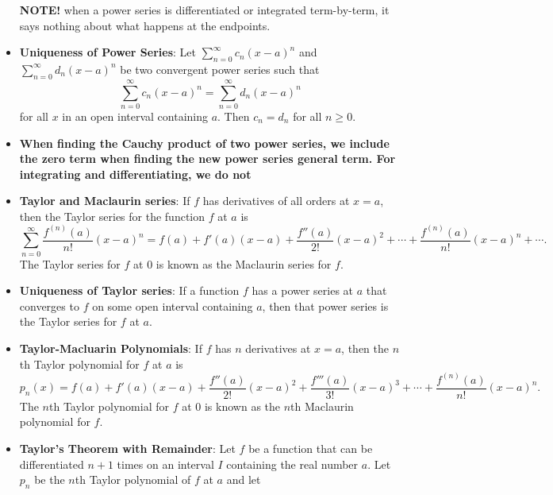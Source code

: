 \documentclass{report}
\begin{document}
\begin{itemize}
                \textbf{NOTE!} when a power series is differentiated or integrated term-by-term, it says nothing about what happens at the endpoints.
            \item \textbf{Uniqueness of Power Series}:
                Let $\sum_{n=0}^{\infty} c_n (x - a)^n$ and $\sum_{n=0}^{\infty} d_n (x - a)^n$ be two convergent power series such that
                \[
                    \sum_{n=0}^{\infty} c_n (x - a)^n = \sum_{n=0}^{\infty} d_n (x - a)^n
                \]
                for all \( x \) in an open interval containing \( a \). Then \( c_n = d_n \) for all \( n \geq 0 \).
            \item \textbf{When finding the Cauchy product of two power series, we include the zero term when finding the new power series general term. For integrating and differentiating, we do not}
            \item \textbf{Taylor and Maclaurin series}:
                If $f$ has derivatives of all orders at $x=a$, then the Taylor series for the function $f$ at $a$ is
                \begin{equation}
                    \sum_{n=0}^{\infty} \frac{f^{(n)}(a)}{n!}(x-a)^n = f(a) + f'(a)(x-a) + \frac{f''(a)}{2!}(x-a)^2 + \cdots + \frac{f^{(n)}(a)}{n!}(x-a)^n + \cdots.
                \end{equation}
                The Taylor series for $f$ at $0$ is known as the Maclaurin series for $f$.
                \bigbreak \noindent 
            \item \textbf{Uniqueness of Taylor series}:  If a function $f$ has a power series at $a$ that converges to $f$ on some open interval containing $a$, then that power series is the Taylor series for $f$ at $a$.
            \item \textbf{Taylor-Macluarin Polynomials}:         
                If $f$ has $n$ derivatives at $x=a$, then the $n$th Taylor polynomial for $f$ at $a$ is
                \begin{equation}
                    p_n(x) = f(a) + f'(a)(x-a) + \frac{f''(a)}{2!}(x-a)^2 + \frac{f'''(a)}{3!}(x-a)^3 + \cdots + \frac{f^{(n)}(a)}{n!}(x-a)^n.
                \end{equation}
                The $n$th Taylor polynomial for $f$ at $0$ is known as the $n$th Maclaurin polynomial for $f$.
            \item \textbf{Taylor’s Theorem with Remainder}:
                Let $f$ be a function that can be differentiated $n+1$ times on an interval $I$ containing the real number $a$. Let $p_n$ be the $n$th Taylor polynomial of $f$ at $a$ and let

\end{itemize}
\end{document}
